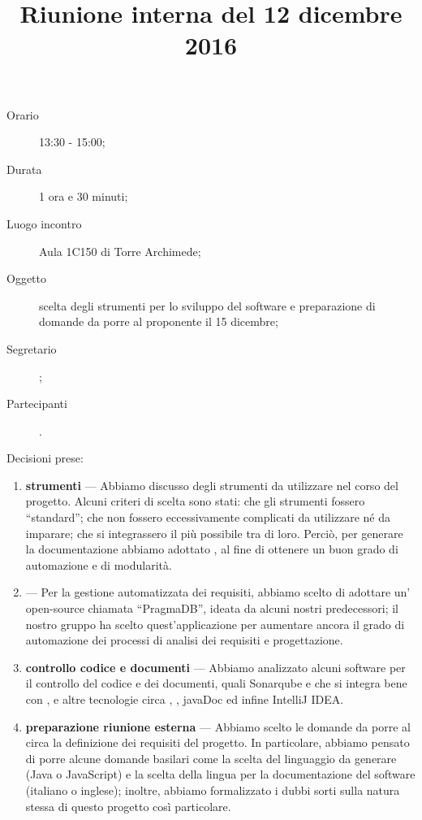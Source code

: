 


\author{\PB}
\supervisor{\MM}
\dest{\ALL}
\title{Riunione interna del 12 dicembre 2016}



\maketitle

\begin{description}
	\item[Orario] 13:30 - 15:00;
	\item[Durata] 1 ora e 30 minuti;
	\item[Luogo incontro] Aula 1C150 di Torre Archimede;
	\item[Oggetto] scelta degli strumenti per lo sviluppo del software e preparazione di domande da porre al proponente il 15 dicembre;
	\item[Segretario] \PB; 
	\item[Partecipanti] \ALL.
\end{description}

Decisioni prese:
\begin{enumerate}
	\item \textbf{strumenti} --- Abbiamo discusso degli strumenti da utilizzare nel corso del progetto. Alcuni criteri di scelta sono stati: che gli strumenti fossero “standard”; che non fossero eccessivamente complicati da utilizzare né da imparare; che si integrassero il più possibile tra di loro. Perciò, per generare la documentazione abbiamo adottato , al fine di ottenere un buon grado di automazione e di modularità.
	\item \textbf{} --- Per la gestione automatizzata dei requisiti, abbiamo scelto di adottare un' open-source chiamata “PragmaDB”, ideata da alcuni nostri predecessori; il nostro gruppo ha scelto quest'applicazione per aumentare ancora il grado di automazione dei processi di analisi dei requisiti e progettazione.
	\item \textbf{controllo codice e documenti} --- Abbiamo analizzato alcuni software per il controllo del codice e dei documenti, quali Sonarqube e  che si integra bene con , e altre tecnologie circa , , javaDoc ed infine IntelliJ IDEA.
	\item \textbf{preparazione riunione esterna} --- Abbiamo scelto le domande da porre al \GP circa la definizione dei requisiti del progetto. In particolare, abbiamo pensato di porre alcune domande basilari come la scelta del linguaggio da generare (Java o JavaScript) e la scelta della lingua per la documentazione del software (italiano o inglese); inoltre, abbiamo formalizzato i dubbi sorti sulla natura stessa di questo progetto così particolare.
\end{enumerate}


